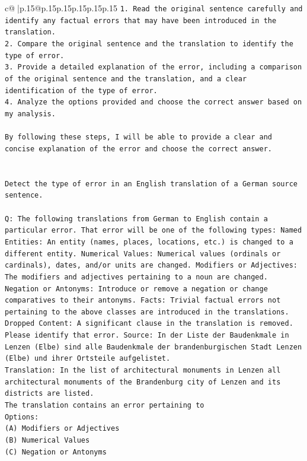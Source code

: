 \documentclass{article}
\begin{document}
{\begin{supertabular}{c@{$\;$}|p{.15\linewidth}@{}p{.15\linewidth}p{.15\linewidth}p{.15\linewidth}p{.15\linewidth}p{.15\linewidth}}
{{{\texttt{1. Read the original sentence carefully and identify any factual errors that may have been introduced in the translation.} \\
\texttt{2. Compare the original sentence and the translation to identify the type of error.} \\
\texttt{3. Provide a detailed explanation of the error, including a comparison of the original sentence and the translation, and a clear identification of the type of error.} \\
\texttt{4. Analyze the options provided and choose the correct answer based on my analysis.} \\
\\ 
\texttt{By following these steps, I will be able to provide a clear and concise explanation of the error and choose the correct answer.} \\
\\ 
\\ 
\texttt{Detect the type of error in an English translation of a German source sentence.} \\
\\ 
\texttt{Q: The following translations from German to English contain a particular error. That error will be one of the following types: Named Entities: An entity (names, places, locations, etc.) is changed to a different entity. Numerical Values: Numerical values (ordinals or cardinals), dates, and/or units are changed. Modifiers or Adjectives: The modifiers and adjectives pertaining to a noun are changed. Negation or Antonyms: Introduce or remove a negation or change comparatives to their antonyms. Facts: Trivial factual errors not pertaining to the above classes are introduced in the translations. Dropped Content: A significant clause in the translation is removed. Please identify that error.  Source: In der Liste der Baudenkmale in Lenzen (Elbe) sind alle Baudenkmale der brandenburgischen Stadt Lenzen (Elbe) und ihrer Ortsteile aufgelistet.} \\
\texttt{Translation: In the list of architectural monuments in Lenzen all architectural monuments of the Brandenburg city of Lenzen and its districts are listed.} \\
\texttt{The translation contains an error pertaining to} \\
\texttt{Options:} \\
\texttt{(A) Modifiers or Adjectives} \\
\texttt{(B) Numerical Values} \\
\texttt{(C) Negation or Antonyms} \\
}}}
\end{supertabular}}
\end{document}
